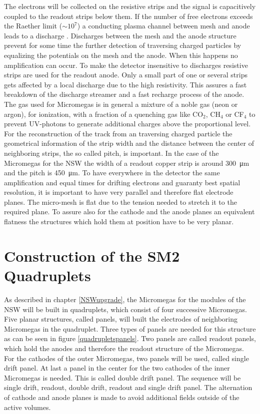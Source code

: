 \documentclass[
a4paper,                                %
twoside,                                %
BCOR1.4cm,                      %
10pt,                           %
headings=normal,                %
headsepline,                    %
clearplainpage, %
final,                                  %
div=14,
parskip=full,
openright,
bibliography=toc
]{scrreprt}
\begin{document}
The electrons will be collected on the resistive strips and the signal is capacitively coupled to the readout strips below them. If the number of free electrons exceeds the Raether limit ($\sim 10^7$) a conducting plasma channel between mesh and anode leads to a discharge \cite{raether1964electron}. Discharges between the mesh and the anode structure prevent for some time the further detection of traversing charged particles by equalizing the potentials on the mesh and the anode. When this happens no amplification can occur. To make the detector insensitive to discharges resistive strips are used for the readout anode. Only a small part of one or several strips gets affected by a local discharge due to the high resistivity. This assures a fast breakdown of the discharge streamer and a fast recharge process of the anode. \cite{laMMPR} The gas used for Micromegas is in general a mixture of a noble gas (neon or argon), for ionization, with a fraction of a quenching gas like CO$_{2}$, CH$_{4}$ or CF$_{4}$ to prevent UV-photons to generate additional charges above the proportional level. \cite{kleinknecht} For the reconstruction of the track from an traversing charged particle the geometrical information of the strip width and the distance between the center of neighboring strips, the so called pitch, is important. In the case of the Micromegas for the NSW the width of a readout copper strip is around \SI{300}{\micro\m} and the pitch is \SI{450}{\micro\m}. To have everywhere in the detector the same amplification and equal times for drifting electrons and guaranty best spatial resolution, it is important to have very parallel and therefore flat electrode planes. The micro-mesh is flat due to the tension needed to stretch it to the required plane. To assure also for the cathode and the anode planes an equivalent flatness the structures which hold them at position have to be very planar.

\section{Construction of the SM2 Quadruplets}\label{constructionSM2} 

As described in chapter \ref{NSWupgrade}, the Micromegas for the modules of the NSW will be built in quadruplets, which consist of four successive Micromegas. Five planar structures, called panels, will built the electrodes of neighboring Micromegas in the quadruplet. Three types of panels are needed for this structure as can be seen in figure \ref{quadrupletspanels}. Two panels are called readout panels, which hold the anodes and therefore the readout structure of the Micromegas. For the cathodes of the outer Micromegas, two panels will be used, called single drift panel. At last a panel in the center for the two cathodes of the inner Micromegas is needed. This is called double drift panel. The sequence will be single drift, readout, double drift, readout and single drift panel. The alternation of cathode and anode planes is made to avoid additional fields outside of the active volumes. 
\end{document}
